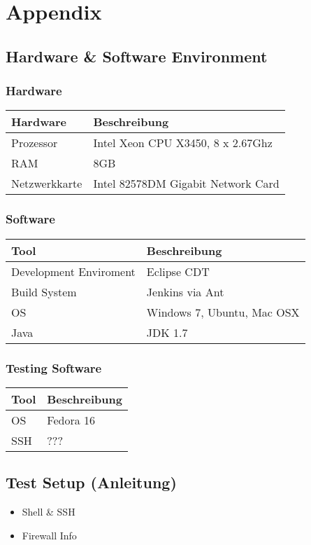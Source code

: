 \section{Appendix}

\subsection{Hardware & Software Environment}

\subsubsection{Hardware}
\begin{tabular}[ht]{l l}
  Hardware & Beschreibung\\
  \hline
  Prozessor & Intel Xeon CPU X3450, 8 x 2.67Ghz\\
  RAM & 8GB\\
  Netzwerkkarte & Intel 82578DM Gigabit Network Card\\
\end{tabular}

\subsubsection{Software}
\begin{tabular}[ht]{l l}
  Tool & Beschreibung\\
  \hline
  Development Enviroment & Eclipse CDT\\
    Build System & Jenkins via Ant\\
  OS & Windows 7, Ubuntu, Mac OSX\\
  Java & JDK 1.7\\
\end{tabular}

\subsubsection{Testing Software}
\begin{tabular}[ht]{l l}
  Tool & Beschreibung\\
  \hline
  OS & Fedora 16\\
  SSH & ???\\
\end{tabular}

	
\subsection{Test Setup (Anleitung)}
\begin{itemize}
\item Shell \& SSH
\item Firewall Info
\end{itemize}	
